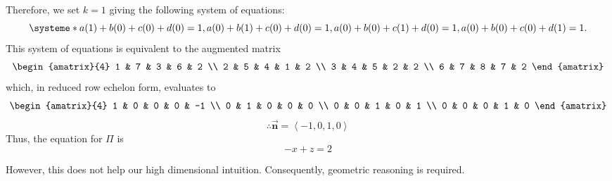 Therefore, we set $k=1$ giving the following system of equations:
\begin{equation*}
    \systeme*{
    a(1)+b(0)+c(0)+d(0)=1,
    a(0)+b(1)+c(0)+d(0)=1,
    a(0)+b(0)+c(1)+d(0)=1,
    a(0)+b(0)+c(0)+d(1)=1.
    }
\end{equation*}
\noindent
This system of equations is equivalent to the augmented matrix
\begin{align*}
    \begin{amatrix}{4}
        1 & 7 & 3 & 6 & 2 \\  
        2 & 5 & 4 & 1 & 2 \\
        3 & 4 & 5 & 2 & 2 \\
        6 & 7 & 8 & 7 & 2
    \end{amatrix}
\end{align*}
which, in reduced row echelon form, evaluates to
\begin{align*}
    \begin{amatrix}{4}
        1 & 0 & 0 & 0 & -1 \\  
        0 & 1 & 0 & 0 & 0 \\
        0 & 0 & 1 & 0 & 1 \\
        0 & 0 & 0 & 1 & 0
    \end{amatrix}
\end{align*}
$$\therefore \Vec{\mathbf{n}}=\left\langle -1, 0, 1, 0 \right\rangle$$
Thus, the equation for $\Pi$ is 
\begin{equation}
    -x+z=2
\end{equation}


However, this does not help our high dimensional intuition. Consequently, geometric reasoning is required.
